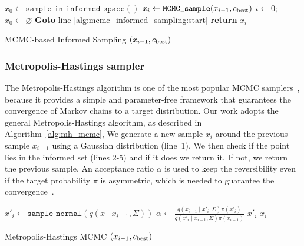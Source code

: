 \documentclass[letterpaper, 10 pt, conference]{ieeeconf}  %
\begin{document}
\begin{algorithm}[t]
	\begin{algorithmic}[1]
		\LOOP 
		\label{alg:mcmc_informed_sampling:start}
			\STATE $x_{0} \leftarrow \texttt{sample\_in\_informed\_space}( )$
		\ENDIF
		\STATE $x_{i} \leftarrow \texttt{MCMC\_sample} (x_{i-1}, c_{\rm best})$ 
			\STATE $ i \leftarrow 0 $; $ x_{0} \leftarrow \varnothing $
			\STATE \textbf{Goto} line \ref{alg:mcmc_informed_sampling:start} 
		\ENDIF
		\STATE \textbf{return} $x_{i}$
		\ENDLOOP 
	\end{algorithmic}
	\caption{\captionstyle MCMC-based Informed Sampling $( x_{i-1}, c_{\rm best})$}
	\label{alg:mcmc_informed_sampling}	
\end{algorithm}

\subsubsection{Metropolis-Hastings sampler}


The Metropolis-Hastings algorithm is one of the most popular MCMC samplers~\cite{CG95}, because it provides a simple and parameter-free framework that guarantees the convergence of Markov chains to a target distribution.
Our work adopts the general Metropolis-Hastings algorithm, as described in Algorithm~\ref{alg:mh_mcmc}, 
We generate a new sample $ x_{i}$ around the previous sample $ x_{i-1}$ using a Gaussian distribution (line~1).
We then check if the point lies in the informed set (lines 2-5) and if it does we return it.
If not, we return the previous sample.
An acceptance ratio $ \alpha $ is used to keep the reversibility even if the target probability $ \pi $ is asymmetric, which is needed to guarantee the convergence~\cite{CG95}. 


\begin{algorithm}[t]
	\begin{algorithmic}[1]
		\STATE $ x'_{i} \leftarrow \texttt{sample\_normal}( q ( x \mid x_{i-1},\Sigma) ) $ 
		\label{start}
		\STATE $ \alpha \leftarrow \frac{ q ( x_{i-1} \mid x'_{i},\Sigma) \pi( x'_{i} ) }{ q ( x'_{i} \mid x_{i-1},\Sigma) \pi( x_{i-1} ) } $
            \RETURN $ x'_{i} $
		\ENDIF
		\RETURN $ x_{i} $
	\end{algorithmic}
	\caption{\captionstyle Metropolis-Hastings MCMC $(x_{i-1}, c_{\rm best})$}
	\label{alg:mh_mcmc}	
\end{algorithm}
\end{document}

